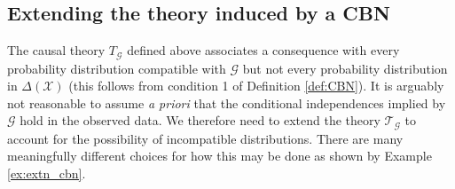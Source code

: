 \subsection{Extending the theory induced by a CBN}

The causal theory $T_{\mathcal{G}}$ defined above associates a consequence with every probability distribution compatible with $\mathcal{G}$ but not every probability distribution in $\Delta(\mathcal{X})$ (this follows from condition 1 of Definition \ref{def:CBN}). It is arguably not reasonable to assume \emph{a priori} that the conditional independences implied by $\mathcal{G}$ hold in the observed data. We therefore need to extend the theory $\mathscr{T}_{\mathcal{G}}$ to account for the possibility of incompatible distributions. There are many meaningfully different choices for how this may be done as shown by Example \ref{ex:extn_cbn}.

